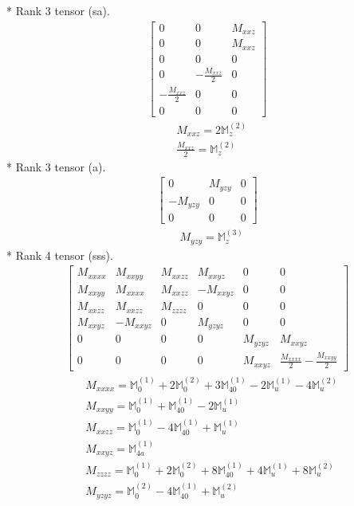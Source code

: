 \documentclass[fleqn,8pt,landscape]{jsarticle}
\begin{document}
* Rank 3 tensor (sa).
\begin{align*}
\begin{bmatrix} 0 & 0 & M_{xxz} \\ 0 & 0 & M_{xxz} \\ 0 & 0 & 0 \\ 0 & - \frac{M_{xxz}}{2} & 0 \\ - \frac{M_{xxz}}{2} & 0 & 0 \\ 0 & 0 & 0 \end{bmatrix}
\end{align*}
\begin{align*}
& M_{xxz} = 2 \mathbb{M}_{z}^{(2)} \\
& \frac{M_{xxz}}{2} = \mathbb{M}_{z}^{(2)}
\end{align*}
* Rank 3 tensor (a).
\begin{align*}
\begin{bmatrix} 0 & M_{yzy} & 0 \\ - M_{yzy} & 0 & 0 \\ 0 & 0 & 0 \end{bmatrix}
\end{align*}
\begin{align*}
& M_{yzy} = \mathbb{M}_{z}^{(3)}
\end{align*}
* Rank 4 tensor (sss).
\begin{align*}
\begin{bmatrix} M_{xxxx} & M_{xxyy} & M_{xxzz} & M_{xxyz} & 0 & 0 \\ M_{xxyy} & M_{xxxx} & M_{xxzz} & - M_{xxyz} & 0 & 0 \\ M_{xxzz} & M_{xxzz} & M_{zzzz} & 0 & 0 & 0 \\ M_{xxyz} & - M_{xxyz} & 0 & M_{yzyz} & 0 & 0 \\ 0 & 0 & 0 & 0 & M_{yzyz} & M_{xxyz} \\ 0 & 0 & 0 & 0 & M_{xxyz} & \frac{M_{xxxx}}{2} - \frac{M_{xxyy}}{2} \end{bmatrix}
\end{align*}
\begin{align*}
& M_{xxxx} = \mathbb{M}_{0}^{(1)} + 2 \mathbb{M}_{0}^{(2)} + 3 \mathbb{M}_{40}^{(1)} - 2 \mathbb{M}_{u}^{(1)} - 4 \mathbb{M}_{u}^{(2)} \\
& M_{xxyy} = \mathbb{M}_{0}^{(1)} + \mathbb{M}_{40}^{(1)} - 2 \mathbb{M}_{u}^{(1)} \\
& M_{xxzz} = \mathbb{M}_{0}^{(1)} - 4 \mathbb{M}_{40}^{(1)} + \mathbb{M}_{u}^{(1)} \\
& M_{xxyz} = \mathbb{M}_{4a}^{(1)} \\
& M_{zzzz} = \mathbb{M}_{0}^{(1)} + 2 \mathbb{M}_{0}^{(2)} + 8 \mathbb{M}_{40}^{(1)} + 4 \mathbb{M}_{u}^{(1)} + 8 \mathbb{M}_{u}^{(2)} \\
& M_{yzyz} = \mathbb{M}_{0}^{(2)} - 4 \mathbb{M}_{40}^{(1)} + \mathbb{M}_{u}^{(2)}
\end{align*}
\end{document}
